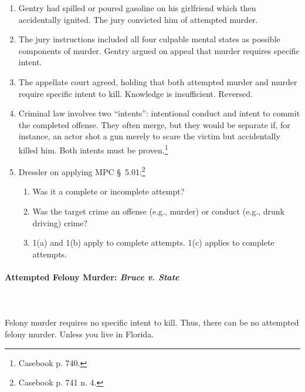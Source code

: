 \begin{enumerate}
    \item Gentry had spilled or poured gasoline on his girlfriend which then 
    accidentally ignited. The jury convicted him of attempted murder.
    \item The jury instructions included all four culpable mental states as 
    possible components of murder. Gentry argued on appeal that murder 
    requires specific intent.
    \item The appellate court agreed, holding that both attempted murder and 
    murder require specific intent to kill. Knowledge is insufficient.  
    Reversed.
    \item Criminal law involves two ``intents'': intentional conduct and 
    intent to commit the completed offense. They often merge, but they would 
    be separate if, for instance, an actor shot a gun merely to scare the 
    victim but accidentally killed him. Both intents must be 
    proven.\footnote{Casebook p. 740.}
    \item Dressler on applying MPC \S\ 5.01:\footnote{Casebook p. 741 n. 4.}
    \begin{enumerate}
        \item Was it a complete or incomplete attempt?
        \item Was the target crime an offense (e.g., murder) or conduct (e.g., 
        drunk driving) crime?
        \item 1(a) and 1(b) apply to complete attempts. 1(c) applies to 
        complete attempts.
    \end{enumerate}
\end{enumerate}

\paragraph{Attempted Felony Murder: \emph{Bruce v. State}}
~\\\\
Felony murder requires no specific intent to kill. Thus, there can be no 
attempted felony murder. Unless you live in Florida.

